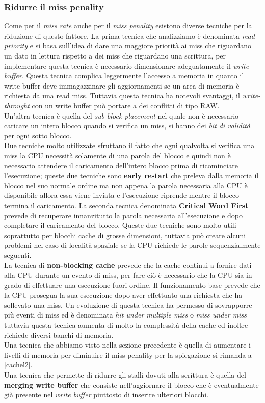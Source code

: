 \subsubsection{Ridurre il miss penality}
Come per il \emph{miss rate} anche per il \emph{miss penality} esistono diverse tecniche per la riduzione di questo fattore.  La prima tecnica che analizziamo è denominata \emph{read priority} e si basa sull'idea di dare una maggiore priorità ai miss che riguardano un dato in lettura rispetto a dei miss che riguardano una scrittura, per implementare questa tecnica è necessario dimensionare adeguatamente il \emph{write buffer}. Questa tecnica complica leggermente l'accesso a memoria in quanto il write buffer deve immagazzinare gli aggiornamenti se un area di memoria è richiesta da una read miss. Tuttavia questa tecnica ha notevoli svantaggi, il \emph{write-throught} con un write buffer può portare a dei conflitti di tipo RAW.\\
Un'altra tecnica è quella del \emph{sub-block placement} nel quale non è necessario caricare un intero blocco quando si verifica un miss, si hanno dei \emph{bit di validità} per ogni sotto blocco.\\
Due tecniche molto utilizzate sfruttano il fatto che ogni qualvolta si verifica una miss la CPU necessità solamente di una parola del blocco e quindi non è necessario attendere il caricamento dell'intero blocco prima di ricominciare l'esecuzione; queste due tecniche sono \textbf{early restart} che preleva dalla memoria il blocco nel suo normale ordine ma non appena la parola necessaria alla CPU è disponibile allora essa viene inviata e l'esecuzione riprende mentre il blocco termina il caricamento. La seconda tecnica denominata \textbf{Critical Word First} prevede di recuperare innanzitutto la parola necessaria all'esecuzione e dopo completare il caricamento del blocco. Queste due tecniche sono molto utili soprattutto per blocchi cache di grosse dimensioni, tuttavia può creare alcuni problemi nel caso di località spaziale se la CPU richiede le parole sequenzialmente seguenti.\\
La tecnica di \textbf{non-blocking cache} prevede che la cache continui a fornire dati alla CPU durante un evento di miss, per fare ciò è necessario che la CPU sia in grado di effettuare una esecuzione fuori ordine. Il funzionamento base prevede che la CPU prosegua la sua esecuzione dopo aver effettuato una richiesta che ha sollevato una miss. Un evoluzione di questa tecnica ha permesso di sovrapporre più eventi di miss ed è denominata \emph{hit under multiple miss} o \emph{miss under miss} tuttavia questa tecnica aumenta di molto la complessità della cache ed inoltre richiede diversi banchi di memoria.\\
Una tecnica che abbiamo visto nella sezione precedente è quella di aumentare i livelli di memoria per diminuire il miss penality per la spiegazione si rimanda a \ref{cachel2}.\\
Una tecnica che permette di ridurre gli stalli dovuti alla scrittura è quella del \textbf{merging write buffer} che consiste nell'aggiornare il blocco che è eventualmente già presente nel \emph{write buffer} piuttosto di inserire ulteriori blocchi.
